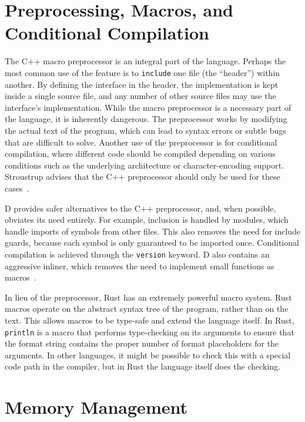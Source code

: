 \documentclass[finalcopy]{srpaper}
\begin{document}
\section{Preprocessing, Macros, and Conditional Compilation}

The C++ macro preprocessor is an integral part of the language. Perhaps the
most common use of the feature is to \texttt{include} one file (the ``header'')
within another. By defining the interface in the header, the implementation is
kept inside a single source file, and any number of other source files may use
the interface's implementation. While the macro preprocessor is a necessary
part of the language, it is inherently dangerous. The preprocessor works by
modifying the actual text of the program, which can lead to syntax errors or
subtle bugs that are difficult to solve. Another use of the preprocessor is
for conditional compilation, where different code should be compiled depending
on various conditions such as the underlying architecture or character-encoding
support. Stroustrup advises that the C++ preprocessor should only be used for
these cases~\cite{stroustrup2013the}.


D provides safer alternatives to the C++ preprocessor, and, when possible,
obviates its need entirely. For example, inclusion is handled by modules, which
handle imports of symbols from other files. This also removes the need for
include guards, because each symbol is only guaranteed to be imported once.
Conditional compilation is achieved through the \texttt{version} keyword. D
also contains an aggressive inliner, which removes the need to implement small
functions as macros~\cite{pretod}.

In lieu of the preprocessor, Rust has an extremely powerful macro system.
Rust macros operate on the abstract syntax tree of the program, rather than on
the text. This allows macros to be type-safe and extend the language itself.
In Rust, \texttt{println} is a macro that performs type-checking on its
arguments to ensure that the format string contains the proper number of
format placeholders for the arguments. In other languages, it might be
possible to check this with a special code path in the compiler, but in Rust
the language itself does the checking.

\section{Memory Management}
\end{document}
